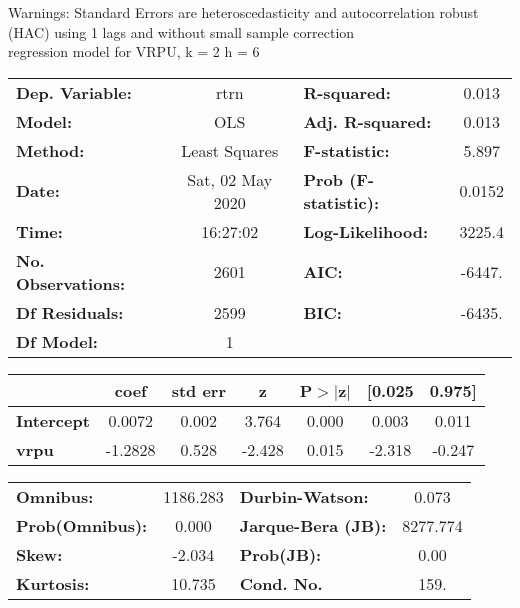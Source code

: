 Warnings: \newline
 [1] Standard Errors are heteroscedasticity and autocorrelation robust (HAC) using 1 lags and without small sample correction\\ 

regression model for VRPU, k = 2 h = 6\begin{center}
\begin{tabular}{lclc}
\toprule
\textbf{Dep. Variable:}    &       rtrn       & \textbf{  R-squared:         } &     0.013   \\
\textbf{Model:}            &       OLS        & \textbf{  Adj. R-squared:    } &     0.013   \\
\textbf{Method:}           &  Least Squares   & \textbf{  F-statistic:       } &     5.897   \\
\textbf{Date:}             & Sat, 02 May 2020 & \textbf{  Prob (F-statistic):} &   0.0152    \\
\textbf{Time:}             &     16:27:02     & \textbf{  Log-Likelihood:    } &    3225.4   \\
\textbf{No. Observations:} &        2601      & \textbf{  AIC:               } &    -6447.   \\
\textbf{Df Residuals:}     &        2599      & \textbf{  BIC:               } &    -6435.   \\
\textbf{Df Model:}         &           1      & \textbf{                     } &             \\
\bottomrule
\end{tabular}
\begin{tabular}{lcccccc}
                   & \textbf{coef} & \textbf{std err} & \textbf{z} & \textbf{P$> |$z$|$} & \textbf{[0.025} & \textbf{0.975]}  \\
\midrule
\textbf{Intercept} &       0.0072  &        0.002     &     3.764  &         0.000        &        0.003    &        0.011     \\
\textbf{vrpu}      &      -1.2828  &        0.528     &    -2.428  &         0.015        &       -2.318    &       -0.247     \\
\bottomrule
\end{tabular}
\begin{tabular}{lclc}
\textbf{Omnibus:}       & 1186.283 & \textbf{  Durbin-Watson:     } &    0.073  \\
\textbf{Prob(Omnibus):} &   0.000  & \textbf{  Jarque-Bera (JB):  } & 8277.774  \\
\textbf{Skew:}          &  -2.034  & \textbf{  Prob(JB):          } &     0.00  \\
\textbf{Kurtosis:}      &  10.735  & \textbf{  Cond. No.          } &     159.  \\
\bottomrule
\end{tabular}
\end{center}

